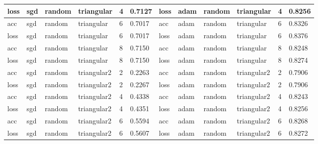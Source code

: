 \begin{table}[H]
\begin{adjustbox}{width=1\textwidth}
\begin{tabular}{|l|l|l|l|l|l||l|l|l|l|l|l|}
loss          & sgd          & random        & triangular      & 4             & 0.7127            & loss          & adam         & random        & triangular      & 4             & 0.8256            \\ \hline
acc           & sgd          & random        & triangular      & 6             & 0.7017            & acc           & adam         & random        & triangular      & 6             & 0.8326            \\ \hline
loss          & sgd          & random        & triangular      & 6             & 0.7017            & loss          & adam         & random        & triangular      & 6             & 0.8376            \\ \hline
acc           & sgd          & random        & triangular      & 8             & 0.7150            & acc           & adam         & random        & triangular      & 8             & 0.8248            \\ \hline
loss          & sgd          & random        & triangular      & 8             & 0.7150            & loss          & adam         & random        & triangular      & 8             & 0.8274            \\ \hline
acc           & sgd          & random        & triangular2     & 2             & 0.2263            & acc           & adam         & random        & triangular2     & 2             & 0.7906            \\ \hline
loss          & sgd          & random        & triangular2     & 2             & 0.2267            & loss          & adam         & random        & triangular2     & 2             & 0.7906            \\ \hline
acc           & sgd          & random        & triangular2     & 4             & 0.4338            & acc           & adam         & random        & triangular2     & 4             & 0.8243            \\ \hline
loss          & sgd          & random        & triangular2     & 4             & 0.4351            & loss          & adam         & random        & triangular2     & 4             & 0.8256            \\ \hline
acc           & sgd          & random        & triangular2     & 6             & 0.5594            & acc           & adam         & random        & triangular2     & 6             & 0.8268            \\ \hline
loss          & sgd          & random        & triangular2     & 6             & 0.5607            & loss          & adam         & random        & triangular2     & 6             & 0.8272            \\ \hline

\end{tabular}
\end{adjustbox}
\end{table}
